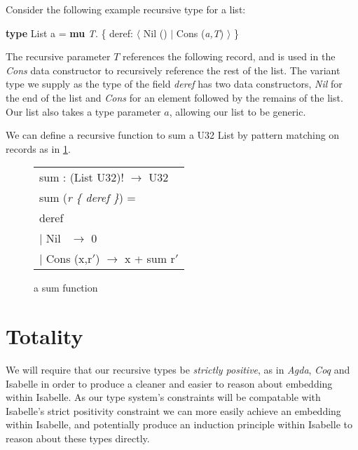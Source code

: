 Consider the following example recursive type for a list:
\begin{center}
    \textbf{type} List a = \textbf{mu} \textit{T}. \{ deref: $\langle$ Nil () $\vert$ Cons (\textit{a,T}) $\rangle$ \}
\end{center}

The recursive parameter $T$ references the following record, and is used in the \textit{Cons} data constructor
to recursively reference the rest of the list.
The variant type  we supply as the type of the field
\textit{deref} has two data constructors, \textit{Nil} for the end of the list and \textit{Cons} for an element
followed by the remains of the list. Our list also takes a type parameter $a$, allowing our list to be generic.

We can define a recursive function to sum a U32 List by pattern matching on records as 
in \ref{fig:sum}.

\begin{figure}%
    \begin{center}
        \begin{tabular}{l}
            sum : (List U32)! $\rightarrow$ U32 \\
            sum (\textit{r \{ deref \}}) = \\
            \hspace{0.8em} deref \\
                \hspace{2em} $\vert$ Nil  \quad\quad\quad$\,$   $\rightarrow$ 0 \\
                \hspace{2em} $\vert$ Cons (x,r$'$)  $\rightarrow$ x + sum r$'$
        \end{tabular}
    \end{center}
    \caption[short]{a sum function}
    \label{fig:sum}
\end{figure}


\section{Totality}

We will require that our recursive types be \textit{strictly positive}, as in \textit{Agda},
\textit{Coq} and Isabelle in order to produce a cleaner and easier to reason about
embedding within Isabelle. As our type system's constraints will be compatable with Isabelle's
strict positivity constraint we can more easily achieve an embedding within Isabelle, and potentially
produce an induction principle within Isabelle to reason about these types directly.

